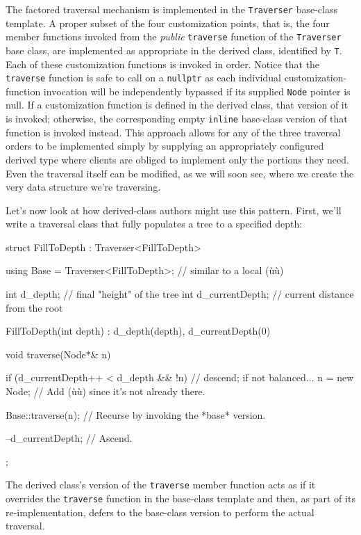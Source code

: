 \noindent The factored traversal mechanism is implemented in the
\lstinline!Traverser! base-class template. A proper subset of the four
customization points, that is, the four member functions invoked from
the \emph{public} \lstinline!traverse! function of the \lstinline!Traverser!
base class, are implemented as appropriate in the derived class,
identified by \lstinline!T!. Each of these customization functions is
invoked in order. Notice that the \lstinline!traverse! function is safe to call on a
\lstinline!nullptr! as each individual customization-function invocation
will be independently bypassed if its supplied \lstinline!Node! pointer is
null. If a customization function is defined in the derived class, that
version of it is invoked; otherwise, the corresponding empty
\lstinline!inline! base-class version of that function is invoked instead.
This approach allows for any of the three traversal orders to be
implemented simply by supplying an appropriately configured derived type
where clients are obliged to implement only the portions they need. Even
the traversal itself can be modified, as we will soon see, where we
create the very data structure we're traversing.

Let's now look at how derived-class authors might use this pattern.
First, we'll write a traversal class that fully populates a tree to a
specified depth:

\begin{emcppslisting}[emcppsbatch=e9]
struct FillToDepth : Traverser<FillToDepth>
{
    using Base = Traverser<FillToDepth>;  // similar to a local (ù{}ù)

    int d_depth;            //  final "height" of the tree
    int d_currentDepth;     //  current distance from the root

    FillToDepth(int depth) : d_depth(depth), d_currentDepth(0) { }

    void traverse(Node*& n)
    {
        if (d_currentDepth++ < d_depth && !n)  // descend; if not balanced...
        {
            n = new Node;     // Add (ù{}ù) since it's not already there.
        }

        Base::traverse(n);    // Recurse by invoking the *base* version.

        --d_currentDepth;     // Ascend.
    }
};
\end{emcppslisting}
    
\noindent The derived class's version of the \lstinline!traverse! member function
acts as if it overrides the \lstinline!traverse! function in the base-class
template and then, as part of its re-implementation, defers to the base-class version to perform the actual traversal.


